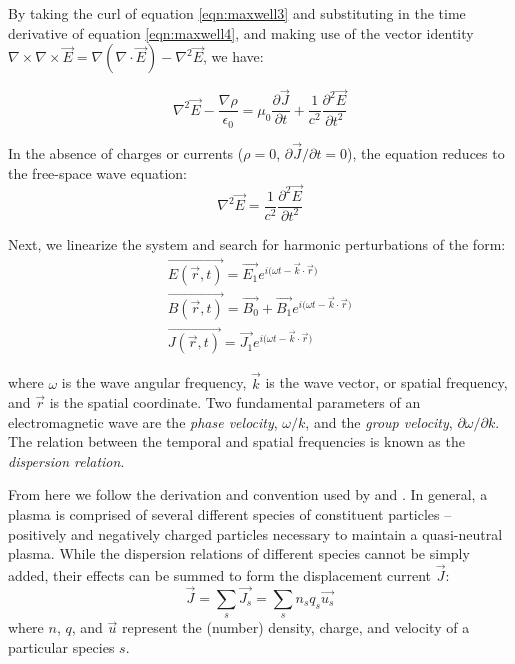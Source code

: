 By taking the curl of equation \ref{eqn:maxwell3} and substituting in the time derivative of equation \ref{eqn:maxwell4}, and making use of the vector identity $\nabla \times \nabla \times \vec{E} = \nabla(\nabla \cdot \vec{E}) - \nabla^2\vec{E}$, we have:

\begin{equation}
\nabla^2\vec{E} - \frac{\nabla\rho}{\epsilon_0} = \mu_0 \frac{\partial \vec{J}}{\partial t} + \frac{1}{c^2}\frac{\partial^2\vec{E}}{\partial t^2}
\label{eqn:dielectric_tensor_derivation_1}
\end{equation}

In the absence of charges or currents ($\rho=0$, $\partial\vec{J}/\partial t=0$), the equation reduces to the free-space wave equation:
\begin{equation}
\nabla^2\vec{E} = \frac{1}{c^2}\frac{\partial^2\vec{E}}{\partial t^2}
\end{equation}

Next, we linearize the system and search for harmonic perturbations of the form:
\begin{eqnarray}
\vec{E(\vec{r},t)} = \vec{E_1}e^{{i (\omega t - \vec{k}\cdot \vec{r}})} \label{eqn:linear1}\\ 
\vec{B(\vec{r},t)} = \vec{B_0} + \vec{B_1}e^{{i (\omega t - \vec{k}\cdot \vec{r}})} \label{eqn:linear2}\\
\vec{J(\vec{r},t)} = \vec{J_1}e^{{i (\omega t - \vec{k}\cdot \vec{r}})}\label{eqn:linear3} 
\end{eqnarray}

where $\omega$ is the wave angular frequency, $\vec{k}$ is the wave vector, or spatial frequency, and $\vec{r}$ is the spatial coordinate. Two fundamental parameters of an electromagnetic wave are the \emph{phase velocity}, $\omega/k$, and the \emph{group velocity}, $\partial\omega/\partial k$. The relation between the temporal and spatial frequencies is known as the \emph{dispersion relation}.

From here we follow the derivation and convention used by \cite{Stix1992} and \cite{Bittencourt2004}. In general, a plasma is comprised of several different species of constituent particles -- positively and negatively charged particles necessary to maintain a quasi-neutral plasma. While the dispersion relations of different species cannot be simply added, their effects can be summed to form the displacement current $\vec{J}$:
\begin{equation}
\vec{J} = \sum_s\vec{J_s} = \sum_s n_s q_s \vec{u_s}
\label{eqn:J}
\end{equation}
where $n$, $q$, and $\vec{u}$ represent the (number) density, charge, and velocity of a particular species $s$. 

